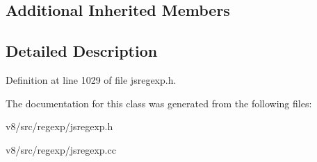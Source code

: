 \subsection*{Additional Inherited Members}


\subsection{Detailed Description}


Definition at line 1029 of file jsregexp.\+h.



The documentation for this class was generated from the following files\+:\begin{DoxyCompactItemize}
\item 
v8/src/regexp/jsregexp.\+h\item 
v8/src/regexp/jsregexp.\+cc\end{DoxyCompactItemize}
